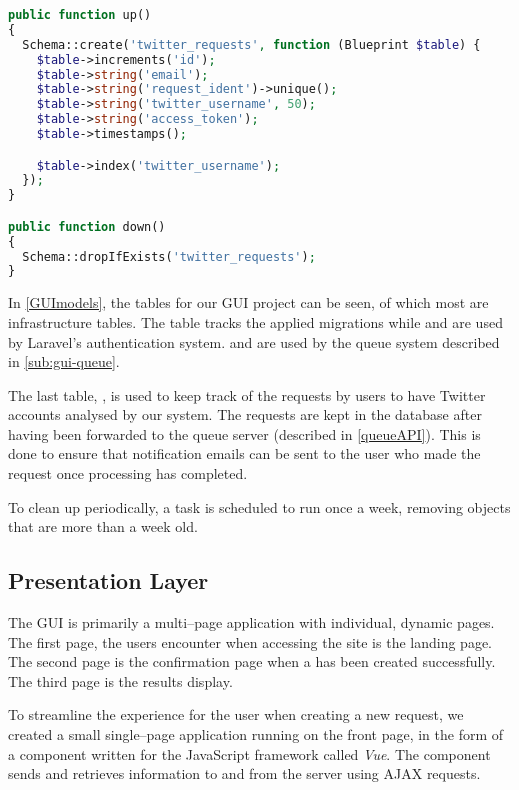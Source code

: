 \begin{minipage}[H]{\linewidth}
\begin{lstlisting}[caption = Example of a migration in Laravel., label =
PhpMigrationEx, language = PHP, style = PHP]
public function up()
{
  Schema::create('twitter_requests', function (Blueprint $table) {
    $table->increments('id');
    $table->string('email');
    $table->string('request_ident')->unique();
    $table->string('twitter_username', 50);
    $table->string('access_token');
    $table->timestamps();

    $table->index('twitter_username');
  });
}

public function down()
{
  Schema::dropIfExists('twitter_requests');
}
\end{lstlisting}
\end{minipage}

In \autoref{GUImodels}, the tables for our GUI project can be seen, of which
most are infrastructure tables. The table  tracks the applied
migrations while  and  are used by Laravel's
authentication system.  and  are used by the queue
system described in \autoref{sub:gui-queue}.\nl

The last table, , is used to keep track of the requests
by users to have Twitter accounts analysed by our system. The requests are kept in
the database after having been forwarded to the queue server (described in
\autoref{queueAPI}). This is done to ensure that notification emails can be
sent to the user who made the request once processing has completed.\nl

To clean up periodically, a task is scheduled to run once a week,
removing  objects that are more than a week old.


\subsection{Presentation Layer}
The \ac{GUI} is primarily a multi--page application with individual,
dynamic pages. The first page, the users encounter when accessing the site is
the landing page. The second page is the confirmation page when a
 has been created successfully. The third page is the
results display.\nl

To streamline the experience for the user when creating a new request,
we created a small single--page application running on the front page, in
the form of a component written for the JavaScript framework called
\textit{Vue}.
The component sends and retrieves information to and from the server using
\ac{AJAX} requests.

